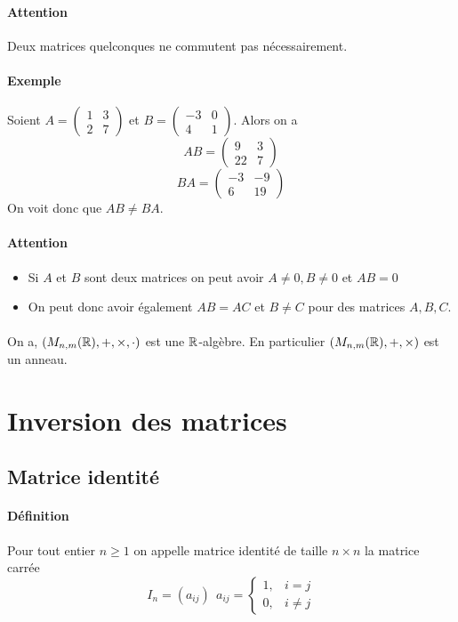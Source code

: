 \paragraph{Attention} Deux matrices quelconques ne commutent pas nécessairement.
\paragraph{Exemple} Soient $A = \begin{pmatrix} 1 & 3 \\ 2 & 7 \end{pmatrix}$ et $B = \begin{pmatrix} -3 & 0 \\ 4 & 1 \end{pmatrix}$. Alors on a
$$A B = \begin{pmatrix} 9 & 3 \\ 22 & 7 \end{pmatrix}$$
$$B A = \begin{pmatrix} -3 & -9 \\ 6 & 19 \end{pmatrix}$$
On voit donc que $A B \neq B A$.

\paragraph{Attention}
\begin{itemize}
  \item Si $A$ et $B$ sont deux matrices on peut avoir $A \neq 0, B \neq 0$ et $AB = 0$
  \item On peut donc avoir également $AB = AC$ et $B \neq C$ pour des matrices $A, B, C$.
\end{itemize}

\paragraph{} On a, $(M_{n, m}(\mathbb{R}), +, \times, \cdot)$ est une $\mathbb{R}$-algèbre. En particulier $(M_{n, m}(\mathbb{R}), +, \times)$ est un anneau.

%
%
\section{Inversion des matrices}
%
%


%
\subsection{Matrice identité}
%
\paragraph{Définition} Pour tout entier $n \geq 1$ on appelle matrice identité de taille $n \times n$ la matrice carrée
    $$I_n = (a_{ij}) ~ ~ a_{ij} = \left\{ \begin{array}{lr} 1, & i=j \\ 0, & i \neq j \end{array} \right.$$

